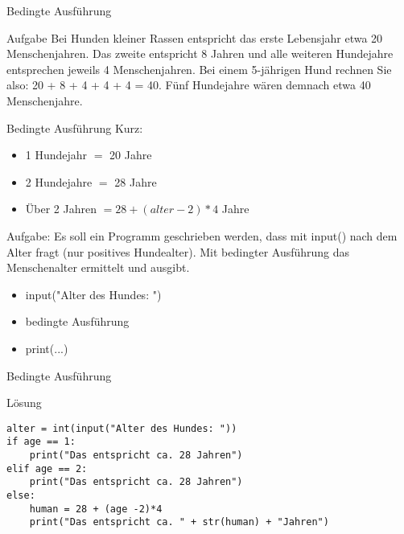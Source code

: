 \begin{frame}{Bedingte Ausführung}
\begin{block}{Aufgabe}
Bei Hunden kleiner Rassen entspricht das erste Lebensjahr etwa 20 Menschenjahren. Das zweite entspricht 8 Jahren und alle weiteren Hundejahre entsprechen jeweils 4 Menschenjahren. Bei einem 5-jährigen Hund rechnen Sie also: 20 + 8 + 4 + 4 + 4 = 40. Fünf Hundejahre wären demnach etwa 40 Menschenjahre.\\
\end{block}
\end{frame}
\begin{frame}{Bedingte Ausführung}
Kurz:
\begin{itemize}
\item 1 Hundejahr $=$ 20 Jahre
\item 2 Hundejahre $=$ 28 Jahre
\item Über 2 Jahren $= 28 + (alter -2) * 4$ Jahre
\end{itemize}
Aufgabe:
Es soll ein Programm geschrieben werden, dass mit input() nach dem Alter fragt (nur positives Hundealter). Mit bedingter Ausführung das Menschenalter ermittelt und ausgibt.
\begin{itemize}
	\item input("Alter des Hundes: ")
	\item bedingte Ausführung
	\item print(...)
\end{itemize}

\end{frame}

\begin{frame}[fragile]{Bedingte Ausführung}
\begin{exampleblock}{Lösung}
\begin{lstlisting}
alter = int(input("Alter des Hundes: "))
if age == 1:
	print("Das entspricht ca. 28 Jahren")
elif age == 2:
	print("Das entspricht ca. 28 Jahren")
else:
	human = 28 + (age -2)*4
	print("Das entspricht ca. " + str(human) + "Jahren")
\end{lstlisting}
\end{exampleblock}
\end{frame}



